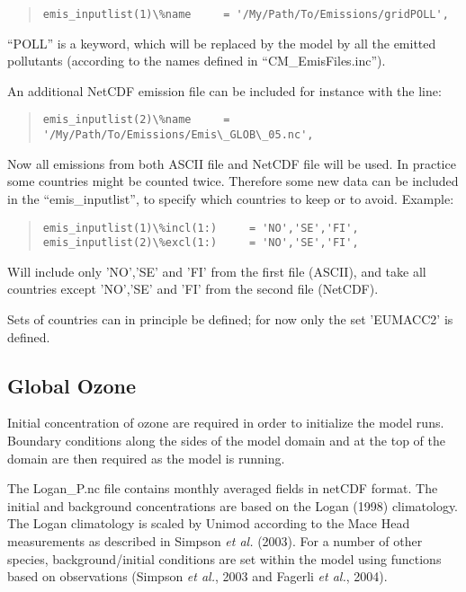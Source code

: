 \begin{quote} \begin{verbatim}
emis_inputlist(1)\%name     = '/My/Path/To/Emissions/gridPOLL',
\end{verbatim} \end{quote} 

``POLL'' is a keyword, which will be replaced by the model by all the emitted pollutants (according to the 
names defined in ``CM\_EmisFiles.inc'').

An additional NetCDF emission file can be included for instance with the line:
\begin{quote} \begin{verbatim}
emis_inputlist(2)\%name     = '/My/Path/To/Emissions/Emis\_GLOB\_05.nc',
\end{verbatim} \end{quote} 

Now all emissions from both ASCII file and NetCDF file will be used. In practice some countries might be counted twice. Therefore some new data can be included in the ``emis\_inputlist'', to specify which countries to keep or to avoid. Example:

\begin{quote} \begin{verbatim}
emis_inputlist(1)\%incl(1:)     = 'NO','SE','FI',
emis_inputlist(2)\%excl(1:)     = 'NO','SE','FI',
\end{verbatim} \end{quote} 

Will include only 'NO','SE' and 'FI' from the first file (ASCII), and take all countries except 'NO','SE' and 'FI' from the second file (NetCDF).

Sets of countries can in principle be defined; for now only the set 'EUMACC2' is defined.

\subsection{Global Ozone}
Initial concentration of ozone are required in order to
initialize the model runs. Boundary conditions along the sides of the model
domain and at the top of the domain are then required as the model is
running.

The Logan\_P.nc file contains monthly averaged fields in netCDF format. 
The initial and background
concentrations are based on the Logan (1998) climatology. The Logan
climatology is scaled by Unimod according to the Mace Head measurements as
described in Simpson {\sl et al.} (2003). For a number of other species, 
background/initial conditions are set within the model using functions 
based on observations (Simpson {\sl et al.}, 2003 and Fagerli {\sl et al.}, 2004).

